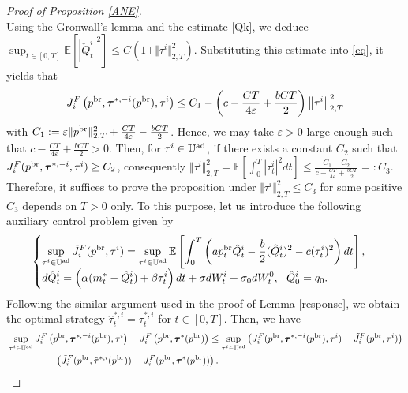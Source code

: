 \documentclass[11pt]{article}
\numberwithin{equation}{section}
\begin{document}
\begin{proof}[Proof of Proposition \ref{ANE}]
\begin{equation*}
\end{equation*}
Using the Gronwall’s lemma and the estimate \eqref{Qk}, we deduce $\sup_{t\in[0,T]}\mathbb{E}\left[|\check{Q}_t^i|^2\right]\leq C(1+\Vert\tau^i\Vert_{2,T}^2)$. Substituting this estimate into \eqref{eq}, it yields that 
\begin{align*}
J_i^F\left(p^{{\rm br}},\boldsymbol{\tau}^{*,-i}(p^{{\rm br}}), \tau^i\right)\leq C_1-\left(c-\frac{CT}{4\varepsilon}+\frac{b CT}{2}\right)\left\|\tau^i\right\|_{2,T}^2
\end{align*}
with $C_1:=\varepsilon \Vert p^{{\rm br}}\Vert_{2, T}^2+\frac{CT}{4\varepsilon}-\frac{bCT}{2}$. Hence, 
we may take $\varepsilon>0$ large enough such that $c-\frac{CT}{4\varepsilon}+\frac{bCT}{2}>0$. Then, for $\tau^i\in \mathbb{U}^{\rm ad}$, if there exists a constant $C_2$ such that $J_i^F(p^{{\rm br}}, \boldsymbol{\tau}^{*,-i}, \tau^i)\geq C_2$, consequently $\Vert \tau^i \Vert_{2,T}^2=\mathbb{E}[\int_0^T|\tau_t^i|^2dt]\leq \frac{C_1-C_2}{c-\frac{CT}{4\varepsilon}+\frac{bCT}{2}}=:C_3$. Therefore, it suffices to prove the proposition under $\Vert\tau^i\Vert_{2,T}^2\leq C_3$ for some positive $C_3$ depends on $T>0$ only. To this purpose, let us introduce the following auxiliary control problem given by
\begin{align}\label{auxproblem}
\begin{cases}
\displaystyle \sup_{\tau^i\in \mathbb{U}^{\rm ad}}\tilde{J}_i^F(p^{{\rm br}}, \tau^i)=\sup_{\tau^i\in \mathbb{U}^{\rm ad}}\mathbb{E}\left[\int_0^T\left(ap_t^{{\rm br}}\hat{Q}_t^i-\frac{b}{2}(\hat{Q}_t^i)^2-c(\tau_t^i)^2\right)dt\right],	\\[0.6em]
\displaystyle d \hat{Q}_t^i=\left(\alpha(m_t^*-\hat{Q}_t^i)+\beta\tau_t^i\right)dt+\sigma d W_t^i+\sigma_0dW_t^0,~~ \hat{Q}_0^i=q_0.		
\end{cases}
\end{align}
Following the similar argument used in the proof of Lemma \ref{response}, we obtain the optimal strategy $\hat{\tau}_t^{*,i}=\tau_t^{*,i}$ for $t\in [0, T]$. Then, we have 
\begin{align}\label{main}
&\sup_{\tau^i\in \mathbb{U}^{\rm ad}}J_i^F\left(p^{{\rm br}},\boldsymbol{\tau}^{*,-i}(p^{{\rm br}}), \tau^i\right)-J_i^F\left(p^{{\rm br}},\boldsymbol{\tau}^*(p^{{\rm br}})\right)\leq \sup_{\tau^i\in \mathbb{U}^{\rm ad}}\left( J_i^F(p^{{\rm br}},\boldsymbol{\tau}^{*,-i}(p^{{\rm br}}), \tau^i)-\tilde{J}_i^F(p^{{\rm br}}, \tau^i)\right)\nonumber\\
&\qquad\qquad+\left(\tilde{J}_i^F(p^{{\rm br}}, \hat{\tau}^{*,i}(p^{{\rm br}}))-J_i^F(p^{{\rm br}},\boldsymbol{\tau}^*(p^{{\rm br}}))\right).

\end{align}
\end{proof}
\end{document}
